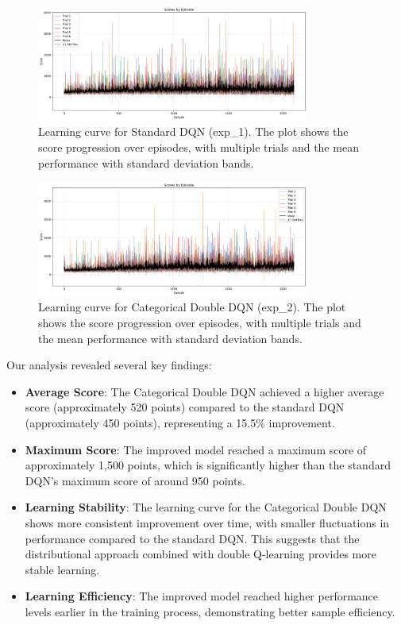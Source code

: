 \documentclass{article} %
\begin{document}
\begin{figure}[h]
  \centering
  \includegraphics[width=0.8\textwidth]{../exp_1/images/score_analysis.png}
  \caption{Learning curve for Standard DQN (exp\_1). The plot shows the score progression over episodes, with multiple trials and the mean performance with standard deviation bands.}
  \label{fig:standard_dqn}
\end{figure}

\begin{figure}[h]
  \centering
  \includegraphics[width=0.8\textwidth]{../exp_2/images/score_analysis.png}
  \caption{Learning curve for Categorical Double DQN (exp\_2). The plot shows the score progression over episodes, with multiple trials and the mean performance with standard deviation bands.}
  \label{fig:cat_double_dqn}
\end{figure}

Our analysis revealed several key findings:

\begin{itemize}
  \item \textbf{Average Score}: The Categorical Double DQN achieved a higher average score (approximately 520 points) compared to the standard DQN (approximately 450 points), representing a 15.5\% improvement.

  \item \textbf{Maximum Score}: The improved model reached a maximum score of approximately 1,500 points, which is significantly higher than the standard DQN's maximum score of around 950 points.

  \item \textbf{Learning Stability}: The learning curve for the Categorical Double DQN shows more consistent improvement over time, with smaller fluctuations in performance compared to the standard DQN. This suggests that the distributional approach combined with double Q-learning provides more stable learning.

  \item \textbf{Learning Efficiency}: The improved model reached higher performance levels earlier in the training process, demonstrating better sample efficiency.
\end{itemize}
\end{document}
